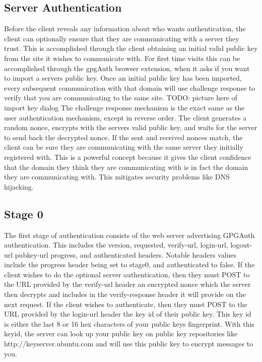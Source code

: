 \documentclass[11pt]{article}
\begin{document}
\subsection{Server Authentication} \label{subsec:serverAuth}
Before the client reveals any information about who wants authentication, the client can optionally ensure that they are communicating with a server they trust. This is accomplished through the client obtaining an initial valid public key from the site it wishes to communicate with. For first time visits this can be accomplished through the gpgAuth browser extension, when it asks if you want to import a servers public key. Once an initial public key has been imported, every subsequent communication with that domain will use challenge response to verify that you are communicating to the same site.
TODO: picture here of import key dialog
The challenge response mechanism is the exact same as the user authentication mechanism, except in reverse order. The client generates a random nonce, encrypts with the servers valid public key, and waits for the server to send back the decrypted nonce. If the sent and received nonces match, the client can be sure they are communicating with the same server they initially registered with.
This is a powerful concept because it gives the client confidence that the domain they think they are communicating with is in fact the domain they are communicating with. This mitigates security problems like DNS hijacking.

\subsection{Stage 0} \label{subsec:stage0}
The first stage of authentication consists of the web server advertising GPGAuth authentication. This includes the version, requested, verify-url, login-url, logout-url pubkey-url progress, and authenticated headers. Notable headers values include the progress header being set to stage0, and authenticated to false. 
If the client wishes to do the optional server authentication, then they must POST to the URL provided by the verify-url header an encrypted nonce which the server then decrypts and includes in the verify-response header it will provide on the next request. 
If the client wishes to authenticate, then they must POST to the URL provided by the login-url header the key id of their public key. This key id is either the last 8 or 16 hex characters of your public keys fingerprint. With this keyid, the server can look up your public key on public key repositories like http://keyserver.ubuntu.com and will use this public key to encrypt messages to you.
\end{document}
